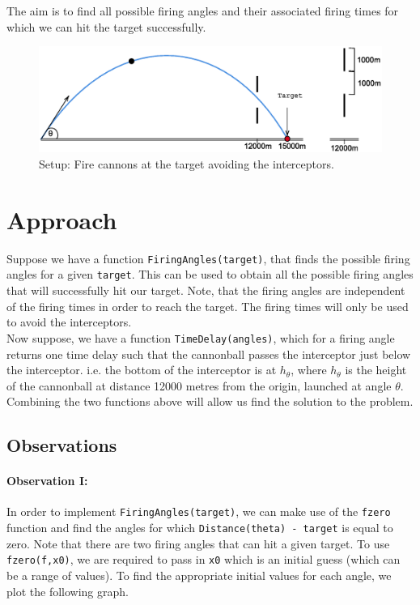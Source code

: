 \documentclass[11pt]{report}
\begin{document}
The aim is to find all possible firing angles and their associated firing times for which we can hit the target successfully.
\begin{figure}[h]
	\centering
  	\includegraphics[scale=0.75]{assets/target.eps}
  	\caption{Setup: Fire cannons at the target avoiding the interceptors.}
  	\label{fig:target}
\end{figure}
\section{Approach}
Suppose we have a function \texttt{FiringAngles(target)}, that finds the possible firing angles for a given \texttt{target}. This can be used to obtain all the possible firing angles that will successfully hit our target. Note, that the firing angles are independent of the firing times in order to reach the target. The firing times will only be used to avoid the interceptors. \\

Now suppose, we have a function \texttt{TimeDelay(angles)}, which for a firing angle returns one time delay such that the cannonball passes the interceptor just below the interceptor. i.e. the bottom of the interceptor is at $h_{\theta}$, where $h_{\theta}$ is the height of the cannonball at distance 12000 metres from the origin, launched at angle $\theta$. \\

Combining the two functions above will allow us find the solution to the problem.

\subsection{Observations}
\paragraph{Observation I:}

In order to implement \texttt{FiringAngles(target)}, we can make use of the \texttt{fzero} function and find the angles for which \texttt{Distance(theta) - target} is equal to zero. Note that there are two firing angles that can hit a given target. To use \texttt{fzero(f,x0)}, we are required to pass in \texttt{x0} which is an initial guess (which can be a range of values). To find the appropriate initial values for each angle, we plot the following graph.
\end{document}
